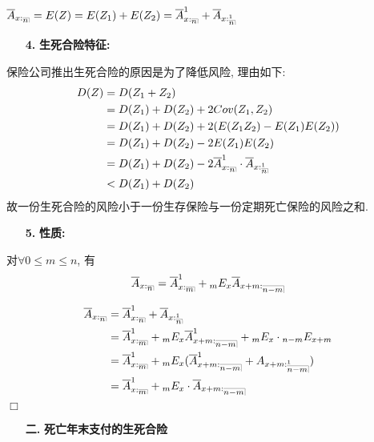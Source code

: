 \documentclass[a4paper,10pt]{ctexbook}
\makeatletter
\newcommand{\hei}{\CJKfamily{hei}}      %
\def\qed{\hfill$\Box$\medskip}
\DeclareRobustCommand{\annu}[1]{_{%
    \def\arraystretch{0}%
    \setlength\arraycolsep{1pt}%
    \setlength\arrayrulewidth{.2pt}%
    \begin{array}[b]{@{}c|}\hline
        \\[\arraycolsep]%
        \scriptstyle #1%
    \end{array}%
}}
\makeatother
\begin{document}
$\overline{A}_{x:\annu{n}}=E(Z)=E(Z_1)+E(Z_2)=\overline{A}_{x:\annu{n}}^1+
    \overline{A}_{x:\annu{n}^1}$

\begin{itemize}
    \item[{\bf\hei 4.}]{\bf\hei 生死合险特征:}
\end{itemize}

保险公司推出生死合险的原因是为了降低风险, 理由如下:
\begin{align*}
    D(Z) & =D(Z_1+Z_2)                                      \\
         & =D(Z_1)+D(Z_2)+2Cov(Z_1,Z_2)                     \\
         & =D(Z_1)+D(Z_2)+2(E(Z_1Z_2)-E(Z_1)E(Z_2))         \\
         & =D(Z_1)+D(Z_2)-2E(Z_1)E(Z_2)                     \\
         & =D(Z_1)+D(Z_2)-2\overline{A}_{x:\annu{n}}^1\cdot
    \overline{A}_{x:\annu{n}^1}                             \\
         & <D(Z_1)+D(Z_2)
\end{align*}
故一份生死合险的风险小于一份生存保险与一份定期死亡保险的风险之和.

\begin{itemize}
    \item[{\bf\hei 5.}]{\bf\hei 性质:}
\end{itemize}

对$\forall 0\le m \le n$, 有
\begin{align}\overline{A}_{x:\annu{n}}=
    \overline{A}_{x:\annu{m}}^1+{}_mE_x\overline{A}_{{x+m}:\annu{n-m}}\end{align}

\proof
\begin{align*}
    \overline{A}_{x:\annu{n}} & =\overline{A}_{x:\annu{n}}^1+\overline{A}_{x:\annu{n}^1}                                           \\
                              & =\overline{A}_{x:\annu{m}}^1+{}_mE_x\overline{A}_{{x+m}:\annu{n-m}}^1+{}_mE_x\cdot {}_{n-m}E_{x+m} \\
                              & =\overline{A}_{x:\annu{m}}^1
    +{}_mE_x(\overline{A}_{{x+m}:\annu{n-m}}^1+{A}_{{x+m}:\annu{n-m}^1})                                                           \\
                              & =
    \overline{A}_{x:\annu{m}}^1+{}_mE_x\cdot \overline{A}_{{x+m}:\annu{n-m}}
\end{align*}
\qed
\begin{itemize}
    \item[{\bf\hei 二.}]{\bf\hei 死亡年末支付的生死合险}
\end{itemize}
\end{document}
